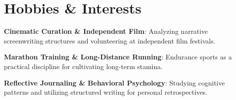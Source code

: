\documentclass[letterpaper,10.5pt]{extarticle}
\begin{document}
    \section{\textcolor{Minty}{Hob}bies \& Interests}
    {\textcolor{darktext}{\textbf{Cinematic Curation \& Independent Film}:} \color{graytext}Analyzing narrative screenwriting structures and volunteering at independent film festivals.}\par
    {\textcolor{darktext}{\textbf{Marathon Training \& Long-Distance Running}:} \color{graytext}Endurance sports as a practical discipline for cultivating long-term stamina.}\par
    {\textcolor{darktext}{\textbf{Reflective Journaling \& Behavioral Psychology}:} \color{graytext}Studying cognitive patterns and utilizing structured writing for personal retrospectives.}
\end{document}
